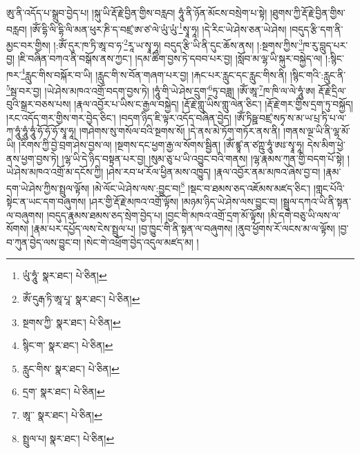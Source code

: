 ཨུ་ནི་འདོད་པ་སྒྲུབ་བྱེད་པ། །སྐུ་ཡི་རྡོ་རྗེ་བྱིན་གྱིས་བརླབ། ཧཱུཾ་ནི་ཉོན་མོངས་བསྲེག་པ་སྟེ། །ཐུགས་ཀྱི་རྡོ་རྗེ་བྱིན་གྱིས་བརླབ། །ཨོཾ་དྷི་ལི་དྷི་ལི་མན་ཕུར་ཎི་ད་བཛྲ་ཨ་ཙ་ལེ་ཡུཾ་ཡུཾ་\footnote{ཡུཾ་ཧཱུཾ་  སྣར་ཐང་།  པེ་ཅིན། }སྭཱ་ཧཱ། །དེ་རིང་ཡེ་ཤེས་ཅན་ཡེ་ཤེས། །བདུད་རྩི་དག་ནི་མྱང་བར་གྱིས། །:ཨོཾ་དུར་ཁ་ཏི་ཨཱ་བ་ཧ་\footnote{ཨོཾ་དུརྒ་ཏི་ཨཱ་པཱ་  སྣར་ཐང་།  པེ་ཅིན། }རཱ་ཡ་སྭཱ་ཧཱ། བདུད་རྩི་ཡི་ནི་དུང་ཆོས་ནས། །:སྔགས་ཀྱིས་\footnote{སྔགས་ཀྱི་  སྣར་ཐང་།  པེ་ཅིན། }ཁ་རུ་བླུད་པར་བྱ། །ཇི་བཞིན་བཀའ་ནི་བསྒོས་ནས་ཀྱང་། །དམ་ཚིག་བྱས་ཏེ་དབབ་པར་བྱ། །སློབ་མ་ལྷ་ཡི་སྐུར་བསྐྱེད་ལ། །:སྙིང་ཁར་\footnote{སྙིང་ག་  སྣར་ཐང་།  པེ་ཅིན། }རླུང་གིས་བསྐོར་བ་ཡི། །རླུང་གི་ས་བོན་གཞག་པར་བྱ། །རྐང་པར་རླུང་དང་རླུང་གིས་ནི། །སྙིང་གའི་:རླུང་ནི་\footnote{རླུང་གིས་  སྣར་ཐང་།  པེ་ཅིན། }སྦ་བར་བྱ། །ཡེ་ཤེས་མཁའ་འགྲོ་བདག་བྱས་ཏེ། །ཧཱུཾ་གི་ཡེ་ཤེས་དྲུག་\footnote{དྲག་  སྣར་ཐང་།  པེ་ཅིན། }ཏུ་བཟླ། །ཨོཾ་ཨཱ་\footnote{ཨཱ་་  སྣར་ཐང་།  པེ་ཅིན། }ཁ་ཁི་ལ་ལེ་ཧཱུཾ་ཨ། རྡོ་རྗེ་དྲིལ་བུའི་སྒྲར་བཅས་པས། །རྣལ་འབྱོར་པ་ཡིས་ང་རྒྱལ་བསྐྱེད། །རྡོ་རྗེ་གླུ་ཡིས་གླུ་ལེན་ཅིང་། །རྡོ་རྗེ་གར་གྱིས་དྲག་ཏུ་བསྐྱོད། །རང་འདོད་གར་གྱིས་གར་བྱེད་ཅིང་། །བདག་ཉིད་ཇི་ལྟར་འདོད་བཞིན་བྱེད། །ཨོཾ་ཏིཥྛ་བཛྲ་སཏྭ་ས་མ་ཡ་པྲ་ཏི་པ་ལ་ཀ་ཧཱུཾ་ཧཱུཾ་ཧཱུཾ་ཧོ་ཧོ་ཧོ་སྭཱ་ཧཱ། །གཤེགས་སུ་གསོལ་བའི་སྔགས་སོ། །དེ་ནས་མེ་ཏོག་གཏོར་ནས་ནི། །གནས་ལྔ་ཡི་ནི་ལྷ་མོ་ཡི། །རིགས་ཀྱི་བྱེ་བྲག་ཤེས་བྱས་ལ། །སྔགས་དང་ཕྱག་རྒྱ་ལ་སོགས་སྦྱིན། །ཨོཾ་ཛྙཱ་ན་ཙཀྵུ་ཧཱུཾ་ཨཿ་སྭཱ་ཧཱ། དེས་མིག་ཕྱེ་ནས་ཕྱག་བྱས་ཏེ། །ལྷ་ཡི་དེ་ཉིད་བསྟན་པར་བྱ། །སུམ་ཅུ་པ་ཡི་འབྱུང་བའི་གནས། །ལྷ་རྣམས་ཀུན་གྱི་བདག་པོ་སྟེ། །ཡེ་ཤེས་མཁའ་འགྲོ་མ་དངོས་ཀྱི། །ཤེས་རབ་ཕ་རོལ་ཕྱིན་མས་འཁྱུད། །རྣལ་འབྱོར་ནམ་མཁའ་ཞེས་བྱ་བ། །རྣམ་དག་ཡེ་ཤེས་ཀྱིས་སྤྲུལ་ལྟོས། །མེ་ལོང་ཡེ་ཤེས་ལས་:བྱུང་བ།\footnote{སྤྲུལ་པ།  སྣར་ཐང་།  པེ་ཅིན། } །སྡང་བ་ཐམས་ཅད་འཇོམས་མཛད་ཅིང་། །གླང་པོའི་སྟེང་ན་ཡང་དག་བཞུགས། །ཤར་གྱི་རྡོ་རྗེ་མཁའ་འགྲོ་ལྟོས། །མཉམ་ཉིད་ཡེ་ཤེས་ལས་བྱུང་བ། །སྦྲུལ་དཀའ་ཡི་ནི་སྟན་ལ་བཞུགས། །བདུད་རྣམས་ཐམས་ཅད་སྲེག་བྱེད་པ། །བྱང་གི་མཁའ་འགྲོ་དྲག་མོ་ལྟོས། །མི་དགེ་བཅུ་ཡི་ལས་ལ་སོགས། །རྣམ་པར་དཔྱོད་ལས་ངེས་སྤྲུལ་པ། །བྱ་ཁྱུང་གི་ནི་སྟན་ལ་བཞུགས། །ནུབ་ཕྱོགས་རོ་ལངས་མ་ལ་ལྟོས། །བྱ་བ་ཀུན་བྱེད་ལས་བྱུང་བ། །སེང་གེ་འཕྲོག་བྱེད་འདུལ་མཛད་མ། །
